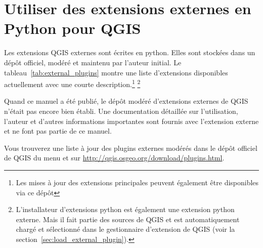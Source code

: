 \section{Utiliser des extensions externes en Python pour QGIS}\label{sec:external_plugins}


Les extensions QGIS externes sont écrites en python. Elles sont stockées dans un dépôt
officiel, modéré et maintenu par l'auteur initial. Le
tableau~\ref{tab:external_plugins} montre une liste d'extensions disponibles
actuellement avec une courte description.\footnote{Les mises à jour des extensions 
principales peuvent également être disponibles via ce dépôt}
\footnote{L'installateur d'extensions python est également une extension
python externe. Mais il fait partie des sources de QGIS et est automatiquement
chargé et sélectionné dans le gestionnaire d'extension de QGIS (voir la
section~\ref{sec:load_external_plugin}).}

Quand ce manuel a été publié, le dépôt modéré d'extensions externes de QGIS n'était
pas encore bien établi. Une documentation détaillée sur l'utilisation,
l'auteur et d'autres informations importantes sont fournis avec l'extension
externe et ne font pas partie de ce manuel.

Vous trouverez une liste à jour des plugins externes modérés dans le dépôt
officiel de QGIS du menu  et sur \url{http://qgis.osgeo.org/download/plugins.html}.

